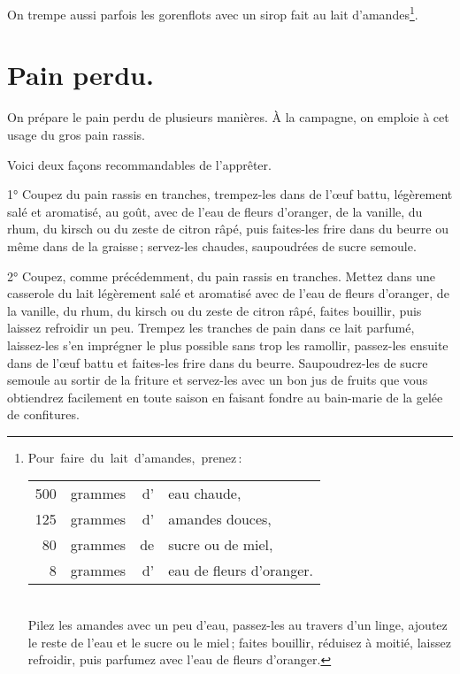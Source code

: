 On trempe aussi parfois les gorenflots avec un sirop fait au lait
d'amandes\footnote{Pour faire du lait d'amandes, prenez :                                                 \\
\begin{tabular}{rrrl}
\hspace{12em} 500 & grammes & d' & eau chaude,                                                            \\
\hspace{12em} 125 & grammes & d' & amandes douces,                                                        \\
\hspace{12em}  80 & grammes & de & sucre ou de miel,                                                      \\
\hspace{12em}   8 & grammes & d' & eau de fleurs d'oranger.                                               \\
\end{tabular}                                                                                             \\
\protect\endgraf
Pilez les amandes avec un peu d'eau, passez-les au travers d'un linge, ajoutez
le reste de l'eau et le sucre ou le miel ; faites bouillir, réduisez à moitié,
laissez refroidir, puis parfumez avec l'eau de fleurs d'oranger.}.

\section*{\centering Pain perdu.}
{}

On prépare le pain perdu de plusieurs manières. À la campagne, on emploie à
cet usage du gros pain rassis.

Voici deux façons recommandables de l'apprêter.

\medskip

1° Coupez du pain rassis en tranches, trempez-les dans de l'œuf battu,
légèrement salé et aromatisé, au goût, avec de l’eau de fleurs d'oranger, de la
vanille, du rhum, du kirsch ou du zeste de citron râpé, puis faites-les frire
dans du beurre ou même dans de la graisse ; servez-les chaudes, saupoudrées de
sucre semoule.

\medskip

2° Coupez, comme précédemment, du pain rassis en tranches. Mettez dans une
casserole du lait légèrement salé et aromatisé avec de l'eau de fleurs
d'oranger, de la vanille, du rhum, du kirsch ou du zeste de citron râpé, faites
bouillir, puis laissez refroidir un peu. Trempez les tranches de pain dans ce
lait parfumé, laissez-les s'en imprégner le plus possible sans trop les
ramollir, passez-les ensuite dans de l'œuf battu et faites-les frire dans du
beurre. Saupoudrez-les de sucre semoule au sortir de la friture et servez-les
avec un bon jus de fruits que vous obtiendrez facilement en toute saison en
faisant fondre au bain-marie de la gelée de confitures.

